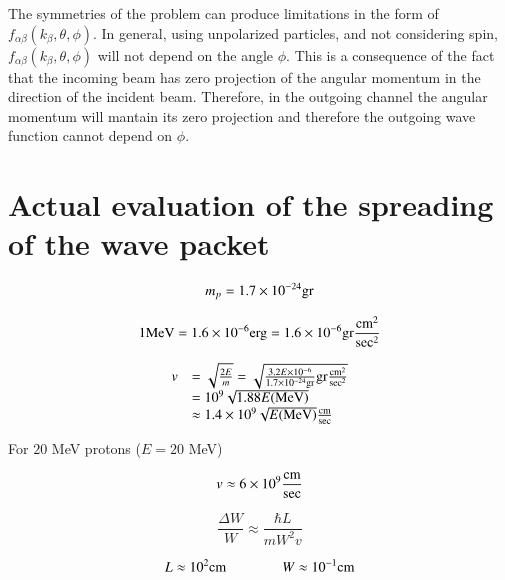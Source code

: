 \documentclass[a4paper,14pt]{book}
\begin{document}
The symmetries of the problem can produce limitations in the form of $f_{\alpha \beta}(k_{\beta},\theta,\phi)$. In general, using unpolarized particles, and not considering spin, $f_{\alpha \beta}(k_{\beta},\theta,\phi)$ will not depend on the angle $\phi$. This is a consequence of the fact that the incoming beam has zero projection of the angular momentum in the direction of the incident beam. Therefore, in the outgoing channel the angular momentum will mantain its zero projection and therefore the outgoing wave function cannot depend on $\phi$.



\section{Actual evaluation of the spreading of the wave packet}

\begin{equation}
m_p = 1.7 \times 10^{-24} {\rm gr}
\end{equation}

\begin{equation}
1 {\rm MeV} = 1.6 \times 10^{-6} {\rm erg} = 1.6 \times 10^{-6} {\rm gr} \frac{{\rm cm}^2}{{\rm sec}^2}
\end{equation}

\begin{equation}
\begin{array}{rl}
v &= \sqrt{\frac{2E}{m}} = \sqrt{\frac{3.2 E \times 10^{-6}}{1.7 \times 10^{-24} {\rm gr}}{\rm gr} \frac{{\rm cm}^2}{{\rm sec}^2}} \\
  &= 10^9 \sqrt{1.88 E ({\rm MeV})} \\
	&\approx 1.4 \times 10^9 \sqrt{E({\rm MeV})} \frac{{\rm cm}}{{\rm sec}}
\end{array}
\end{equation}

For $20$ MeV protons ($E = 20$ MeV)

\begin{equation}
v \approx 6 \times 10^{9} \frac{{\rm cm}}{{\rm sec}}
\end{equation}

\begin{equation}
\frac{\Delta W}{W} \approx \frac{\hbar L}{m W^2 v}
\end{equation}

\begin{equation}
L \approx 10^2 {\rm cm} \qquad \qquad W \approx 10^{-1} {\rm cm}
\end{equation}
\end{document}
